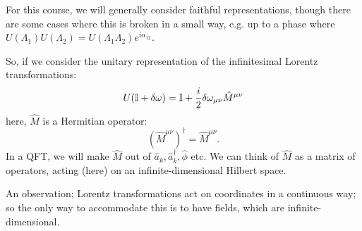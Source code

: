 
For this course, we will generally consider faithful representations, though there are some cases where this is broken in a small way, e.g. up to a phase where $U(\Lambda_1)U(\Lambda_2) = U(\Lambda_1\Lambda_2)e^{i\alpha_{12}}$. 

So, if we consider the unitary representation of the infinitesimal Lorentz transformations:
\begin{equation}
    U(\mathbb{I} + \delta\omega) = \mathbb{I} + \frac{i}{2}\delta\omega_{\mu\nu}\hat{M}^{\mu\nu}
\end{equation}
here, $\hat{M}$ is a Hermitian operator:
\begin{equation}
    (\hat{M}^{\mu\nu})^\dagger = \hat{M}^{\mu\nu}.
\end{equation}
In a QFT, we will make $\hat{M}$ out of $\hat{a}_k, \hat{a}_k^\dagger, \hat{\phi}$ etc. We can think of $\hat{M}$ as a matrix of operators, acting (here) on an infinite-dimensional Hilbert space.

An observation; Lorentz transformations act on coordinates in a continuous way; so the only way to accommodate this is to have fields, which are infinite-dimensional.

